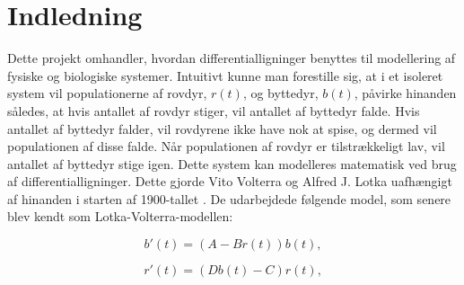 \chapter{Indledning}





Dette projekt omhandler, hvordan differentialligninger benyttes til modellering af fysiske og biologiske systemer. Intuitivt kunne man forestille sig, at i et isoleret system vil populationerne af rovdyr, $r(t)$, og byttedyr, $b(t)$, påvirke hinanden således, at hvis antallet af rovdyr stiger, vil antallet af byttedyr falde. Hvis antallet af byttedyr falder, vil rovdyrene ikke have nok at spise, og dermed vil populationen af disse falde. Når populationen af rovdyr er tilstrækkeligt lav, vil antallet af byttedyr stige igen. 
Dette system kan modelleres matematisk ved brug af differentialligninger. Dette gjorde Vito Volterra og Alfred J. Lotka uafhængigt af hinanden i starten af 1900-tallet \citep{wikiLV}. De udarbejdede følgende model, som senere blev kendt som Lotka-Volterra-modellen:

\begin{equation}\label{byttedyr}
    b'(t) = (A-Br(t)) b(t), 
\end{equation}

\begin{equation}\label{rovdyr}
    r'(t) = (Db(t)-C) r(t),
\end{equation}

